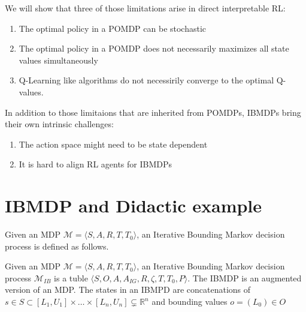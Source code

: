 We will show that three of those limitations arise in direct interpretable RL:
\begin{enumerate}
    \item The optimal policy in a POMDP can be stochastic
    \item The optimal policy in a POMDP does not necessarily maximizes all state values simultaneously
    \item Q-Learning like algorithms do not necessirily converge to the optimal Q-values.
\end{enumerate}

In addition to those limitaions that are inherited from POMDPs, IBMDPs bring their own intrinsic challenges:
\begin{enumerate}
    \item The action space might need to be state dependent
    \item It is hard to align RL agents for IBMDPs
\end{enumerate}

\section{IBMDP and Didactic example}
Given an MDP $\mathcal{M}= \langle S, A, R, T, T_0 \rangle$, an Iterative Bounding Markov decision process is defined as follows.
\begin{definition}
    Given an MDP $\mathcal{M}= \langle S, A, R, T, T_0 \rangle$, an Iterative Bounding Markov decision process $\mathcal{M}_{IB}$ is a tuble $\langle S, O, A, A_{IG}, R, \zeta, T, T_0, P\rangle$.
    The IBMDP is an augmented version of an MDP. The states in an IBMPD are concatenations of $s\in S \subset [L_1, U_1]\times\dots \times [L_n, U_n] \subsetneq \mathbb{R}^n$ and bounding values $o = (L_0) \in O$ 
\end{definition}
